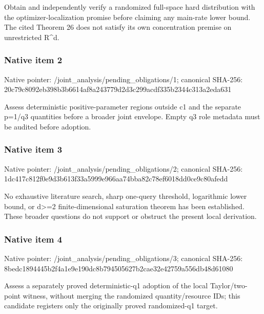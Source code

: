 \documentclass[10pt,a4paper]{article}
\begin{document}
\begingroup\raggedright\sloppy Obtain and independently verify a randomized full-space hard distribution with the optimizer-localization promise before claiming any main-rate lower bound. The cited Theorem 26 does not satisfy its own concentration premise on unrestricted R\textasciicircum{}d.\par\endgroup

\subsubsection{Native item 2}
Native pointer: /joint\_\allowbreak{}analysis/pending\_\allowbreak{}obligations/1; canonical SHA-256: 20c79c8092eb398b3b6614af8a243779d2d3c299acdf335b2344c313a2eda631

\begingroup\raggedright\sloppy Assess deterministic positive-parameter regions outside c1 and the separate p=\allowbreak{}1/\allowbreak{}q3 quantities before a broader joint envelope. Empty q3 role metadata must be audited before adoption.\par\endgroup

\subsubsection{Native item 3}
Native pointer: /joint\_\allowbreak{}analysis/pending\_\allowbreak{}obligations/2; canonical SHA-256: 1dc417c812f0e9d3b613f33a5999e966aa74bba82c78ef6018dd0ce9c80afedd

\begingroup\raggedright\sloppy No exhaustive literature search,\allowbreak{} sharp one-query threshold,\allowbreak{} logarithmic lower bound,\allowbreak{} or d>=\allowbreak{}2 finite-dimensional saturation theorem has been established. These broader questions do not support or obstruct the present local derivation.\par\endgroup

\subsubsection{Native item 4}
Native pointer: /joint\_\allowbreak{}analysis/pending\_\allowbreak{}obligations/3; canonical SHA-256: 8bedc1894445b2f4a1e9e190dc8b794505627b2cae32e42759a556db48d61080

\begingroup\raggedright\sloppy Assess a separately proved deterministic-q1 adoption of the local Taylor/\allowbreak{}two-point witness,\allowbreak{} without merging the randomized quantity/\allowbreak{}resource IDs;\allowbreak{} this candidate registers only the originally proved randomized-q1 target.\par\endgroup
\end{document}
